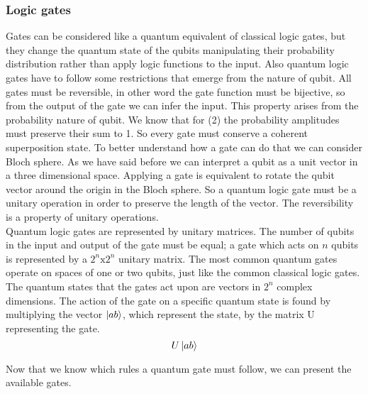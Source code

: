 \documentclass[main.tex]{subfiles}
\theoremstyle{definition}
\begin{document}
	\subsubsection{Logic gates}Gates can be considered like a quantum equivalent of classical logic gates, but they change the 
	quantum state of the qubits manipulating their probability distribution rather than apply logic functions to the input. 
	Also quantum logic gates have to follow some restrictions that emerge from the nature of qubit. All gates must be 
	reversible, in other word the gate function must be	bijective, so from the output of the gate we can infer the input.
	This property arises from the probability nature of qubit. We know that for (2) the probability amplitudes must preserve their
	sum to 1. So every gate must conserve a coherent superposition state. To better understand how a gate can do that we can consider
	Bloch sphere. As we have said before we can interpret a qubit as a unit vector in a three dimensional space. Applying a gate is 
	equivalent to rotate the qubit vector around the origin in the Bloch sphere. So a quantum logic gate must be a unitary operation 
	in order to preserve the length of the vector. The reversibility is a property of unitary operations.\\
	
	Quantum logic gates are represented by unitary matrices. The number of qubits in the input and output of the gate must be 
	equal; a gate which acts on $n$ qubits is represented by a $2^n\text{x}2^n$ unitary matrix. The most common quantum gates operate on 
	spaces of one or two qubits, just like the common classical logic gates. The quantum states that the gates act upon are vectors 
	in $2^n$ complex dimensions. The action of the gate on a specific quantum state is found by multiplying 
	the vector $\ket{ab}$, which represent the state, by the matrix U representing the gate.
	\begin{equation}
	U\ket{ab}
	\end{equation}
	
	Now that we know which rules a quantum gate must follow, we can present the available gates.
\end{document}

